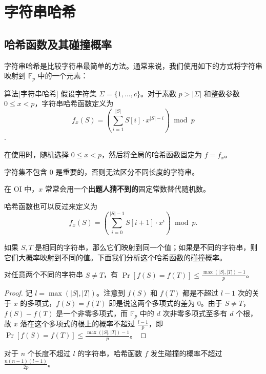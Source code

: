 \chapter{字符串哈希}


\section{哈希函数及其碰撞概率}

字符串哈希是比较字符串最简单的方法。通常来说，我们使用如下的方式将字符串映射到 $\mathbb F_p$ 中的一个元素：

\begin{descbox}{算法}[字符串哈希]
    假设字符集 $\Sigma=\{1,\ldots,c\}$。对于素数 $p>|\Sigma|$ 和整数参数 $0\le x<p$，字符串哈希函数定义为
    $$
    f_x(S)=\left(\sum_{i=1}^{|S|} S[i]\cdot x^{|S|-i}\right) \bmod p
    $$.

    在使用时，随机选择 $0\le x<p$，然后将全局的哈希函数固定为 $f=f_x$。
\end{descbox}
\begin{remark}
    字符集不包含 $0$ 是重要的，否则无法区分不同长度的字符串。
    
    在 OI 中，$x$ 常常会用一个\textbf{出题人猜不到的}固定常数替代随机数。

    哈希函数也可以反过来定义为
    $$
    f_x(S)=\left(\sum_{i=0}^{|S|-1} S[i+1]\cdot x^{i}\right) \bmod p.
    $$
\end{remark}

如果 $S,T$ 是相同的字符串，那么它们映射到同一个值；如果是不同的字符串，则它们大概率映射到不同的值。下面我们分析这个哈希函数的碰撞概率。

\begin{theorem}
    对任意两个不同的字符串 $S\neq T$，有 $\Pr[f(S)=f(T)]\le \frac{\max(|S|,|T|)-1}{p}$。
\end{theorem}
\begin{proof}
    记 $l=\max(|S|,|T|)$。注意到 $f(S)$ 和 $f(T)$ 都是不超过 $l-1$ 次的关于 $x$ 的多项式，$f(S)=f(T)$ 即是说这两个多项式的差为 $0$。由于 $S\ne T$，$f(S)-f(T)$ 是一个非零多项式，而 $\mathbb F_p$ 中的 $d$ 次非零多项式至多有 $d$ 个根，故 $x$ 落在这个多项式的根上的概率不超过 $\frac{l-1}{p}$，即 $\Pr[f(S)=f(T)]\le \frac{\max(|S|,|T|)-1}{p}$。
\end{proof}
\begin{corollary}
    对于 $n$ 个长度不超过 $l$ 的字符串，哈希函数 $f$ 发生碰撞的概率不超过 $\frac{n(n-1)(l-1)}{2p}$。
\end{corollary}


